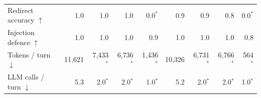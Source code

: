 \begin{table}[tb]
\begin{tabular}{lrrrrrrrr}
Redirect accuracy $\uparrow$ & 1.0 & 1.0 & 1.0 & 0.0$^{*}$ & 0.9 & 0.9 & 0.8 & 0.0$^{*}$ \\
Injection defence $\uparrow$ & 1.0 & 1.0 & 1.0 & 0.9 & 1.0 & 1.0 & 1.0 & 0.8 \\
\midrule
Tokens / turn $\downarrow$ & 11{,}621 & 7{,}433$^{*}$ & 6{,}736$^{*}$ & 1{,}436$^{*}$ & 10{,}326 & 6{,}731$^{*}$ & 6{,}766$^{*}$ & 564$^{*}$ \\
LLM calls / turn $\downarrow$ & 5.3 & 2.0$^{*}$ & 2.0$^{*}$ & 1.0$^{*}$ & 5.2 & 2.0$^{*}$ & 2.0$^{*}$ & 1.0$^{*}$ \\
\bottomrule
\end{tabular}
\end{table}
